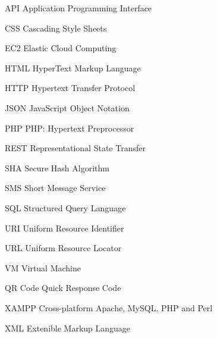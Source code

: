 \begin{Nomencl}[6em]
	\item[API] Application Programming Interface
	\item[CSS] Cascading Style Sheets
	\item[EC2]      Elastic Cloud Computing
	\item[HTML]		HyperText Markup Language
	\item[HTTP]     Hypertext Transfer Protocol
	\item[JSON]		JavaScript Object Notation
	\item[PHP]      PHP: Hypertext Preprocessor
	\item[REST]     Representational State Transfer 
	\item[SHA]		Secure Hash Algorithm
	\item[SMS]      Short Message Service
	\item[SQL]      Structured Query Language
	\item[URI] 		Uniform Resource Identifier
	\item[URL]		Uniform Resource Locator
	\item[VM]		Virtual Machine
	\item[QR Code]	Quick Response Code
	\item[XAMPP]    Cross-platform Apache, MySQL, PHP and Perl
	\item[XML]      Extenible Markup Language

\end{Nomencl}


\endinput
